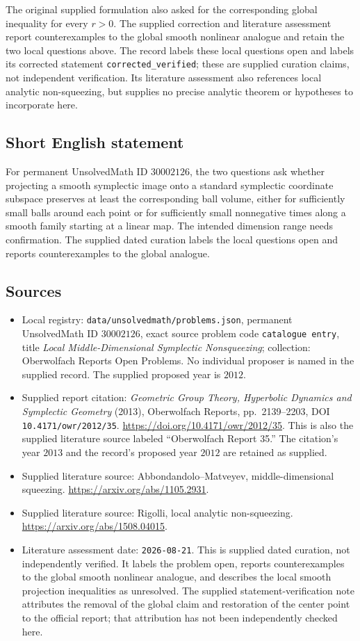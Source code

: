 \documentclass[11pt]{article}
\begin{document}
The original supplied formulation also asked for the corresponding global inequality for every \(r>0\). The supplied correction and literature assessment report counterexamples to the global smooth nonlinear analogue and retain the two local questions above. The record labels these local questions open and labels its corrected statement \texttt{corrected\_verified}; these are supplied curation claims, not independent verification. Its literature assessment also references local analytic non-squeezing, but supplies no precise analytic theorem or hypotheses to incorporate here.
\subsection{Short English statement}
For permanent UnsolvedMath ID \(30002126\), the two questions ask whether projecting a smooth symplectic image onto a standard symplectic coordinate subspace preserves at least the corresponding ball volume, either for sufficiently small balls around each point or for sufficiently small nonnegative times along a smooth family starting at a linear map. The intended dimension range needs confirmation. The supplied dated curation labels the local questions open and reports counterexamples to the global analogue.
\subsection{Sources}
\begin{itemize}
\item Local registry: \texttt{data/unsolvedmath/problems.json}, permanent UnsolvedMath ID \(30002126\), exact source problem code \texttt{catalogue entry}, title \emph{Local Middle-Dimensional Symplectic Nonsqueezing}; collection: Oberwolfach Reports Open Problems. No individual proposer is named in the supplied record. The supplied proposed year is \(2012\).
\item Supplied report citation: \emph{Geometric Group Theory, Hyperbolic Dynamics and Symplectic Geometry} (2013), Oberwolfach Reports, pp.~2139--2203, DOI \texttt{10.4171/owr/2012/35}. \url{https://doi.org/10.4171/owr/2012/35}. This is also the supplied literature source labeled ``Oberwolfach Report 35.'' The citation's year \(2013\) and the record's proposed year \(2012\) are retained as supplied.
\item Supplied literature source: Abbondandolo--Matveyev, middle-dimensional squeezing. \url{https://arxiv.org/abs/1105.2931}.
\item Supplied literature source: Rigolli, local analytic non-squeezing. \url{https://arxiv.org/abs/1508.04015}.
\item Literature assessment date: \texttt{2026-08-21}. This is supplied dated curation, not independently verified. It labels the problem open, reports counterexamples to the global smooth nonlinear analogue, and describes the local smooth projection inequalities as unresolved. The supplied statement-verification note attributes the removal of the global claim and restoration of the center point to the official report; that attribution has not been independently checked here.
\end{itemize}
\end{document}
